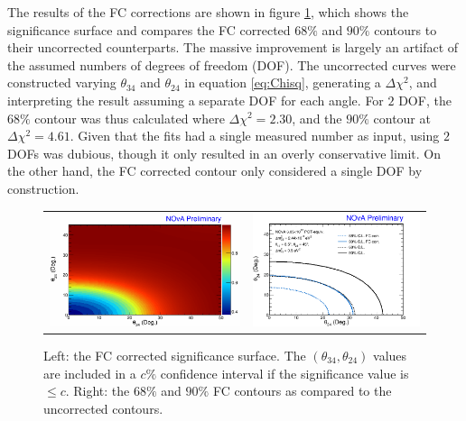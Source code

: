 The results of the FC corrections are shown in figure \ref{fig:Fit2DFC}, which shows the significance surface and compares the FC corrected $68\%$ and $90\%$ contours to their uncorrected counterparts. The massive improvement is largely an artifact of the assumed numbers of degrees of freedom (DOF). The uncorrected curves were constructed varying $\theta_{34}$ and $\theta_{24}$ in equation \ref{eq:Chisq}, generating a $\Delta\chi^2$, and interpreting the result assuming a separate DOF for each angle. For $2$ DOF, the $68\%$ contour was thus calculated where $\Delta\chi^2 = 2.30$, and the $90\%$ contour at $\Delta\chi^2 = 4.61$. Given that the fits had a single measured number as input, using $2$ DOFs was dubious, though it only resulted in an overly conservative limit. On the other hand, the FC corrected contour only considered a single DOF by construction.
\begin{figure}[htbp]
  \centering
  \begin{tabular}{c c}
    \includegraphics[width=.47\textwidth]{figures/Fits/cFCSig.png} &
    \includegraphics[width=.47\textwidth]{figures/Fits/2D3424FC.png} \\
  \end{tabular}
  \caption[FC Corrected Significance Surface and $68\%$ and $90\%$ Contours]{Left: the FC corrected significance surface. The $(\theta_{34}, \theta_{24})$ values are included in a $c\%$ confidence interval if the significance value is $\leq c$. Right: the $68\%$ and $90\%$ FC contours as compared to the uncorrected contours.}
  \label{fig:Fit2DFC}
\end{figure}

